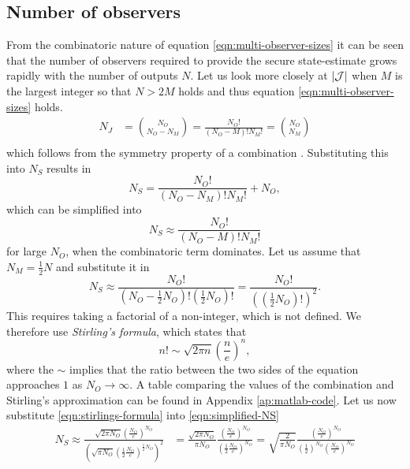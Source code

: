 \subsection{Number of observers}
From the combinatoric nature of equation \eqref{eqn:multi-observer-sizes} it can be seen that the number of observers required to provide the secure state-estimate grows rapidly with the number of outputs $N$. Let us look more closely at $|\mathcal{J}|$ when $M$ is the largest integer so that $N>2M$ holds and thus equation \eqref{eqn:multi-observer-sizes} holds.
\begin{equation*}
    \begin{split}
        N_J &= \binom{N_O}{N_O-N_M}  = \frac{N_O!}{(N_O-M)!N_M!} = \binom{N_O}{N_M} \\
    \end{split}
\end{equation*}
which follows from the symmetry property of a combination \cite[Section 1.1]{Mazur2010PrinciplesCombinatorics}. Substituting this into $N_S$ results in
\begin{equation*}
    N_S = \frac{N_O!}{(N_O-N_M)!N_M!} + N_O,
\end{equation*}
which can be simplified into
\begin{equation*}
    N_S \approx \frac{N_O!}{(N_O-M)!N_M!}
\end{equation*}
for large $N_O$, when the combinatoric term dominates. Let us assume that $N_M=\frac{1}{2}N$ and substitute it in
\begin{equation}\label{eqn:simplified-NS}
    N_S \approx \frac{N_O!}{(N_O-\frac{1}{2}N_O)!(\frac{1}{2}N_O)!} = \frac{N_O!}{\left( \left( \frac{1}{2}N_O \right) ! \right)^2}.
\end{equation}
This requires taking a factorial of a non-integer, which is not defined. We therefore use \textit{Stirling's formula}\cite{Beals2012GammaZeta}, which states that
\begin{equation}\label{eqn:stirlings-formula}
    n! \sim \sqrt{2\pi n} \left( \frac{n}{e} \right)^n,
\end{equation}
where the $\sim$ implies that the ratio between the two sides of the equation approaches $1$ as $N_O \rightarrow \infty$. A table comparing the values of the combination and Stirling's approximation can be found in Appendix \ref{ap:matlab-code}. Let us now substitute \eqref{eqn:stirlings-formula} into \eqref{eqn:simplified-NS}
\begin{equation*}
    \begin{split}
        N_S \approx  \frac{\sqrt{2 \pi N_O}( \frac{N_O}{e} )^{N_O}}{\left( \sqrt{\pi N_O}(\frac{1}{2} \frac{N_O}{e} )^{\frac{1}{2}N_O} \right)^2} &= \frac{\sqrt{2 \pi N_O}}{\pi N_O} \frac{( \frac{N_O}{e} )^{N_O}}{(\frac{1}{2} \frac{N_O}{e} )^{N_O}} = \sqrt{\frac{2}{\pi N_O}} \frac{( \frac{N_O}{e} )^{N_O}}{(\frac{1}{2})^{N_O} (\frac{N_O}{e} )^{N_O}} \\
    \end{split}
\end{equation*}

